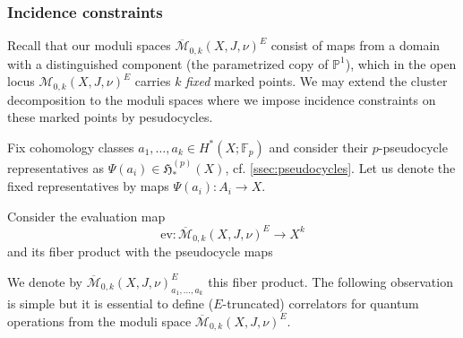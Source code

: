 \documentclass[reqno]{amsart}
\numberwithin{equation}{section}
\numberwithin{equation}{section}
\numberwithin{equation}{section}
\theoremstyle{definition}
\theoremstyle{remark}
\theoremstyle{remark}
\newcommand{\ov}{\overline}
\begin{document}
\subsubsection{Incidence constraints}

Recall that our moduli spaces $\ov{\mathcal{M}}_{0,k}(X,J, \nu)^E$ consist of maps from a domain with a distinguished component (the parametrized copy of $\mathbb{P}^1$), which in the open locus $\mathcal{M}_{0,k}(X,J, \nu)^E$ carries $k$ \emph{fixed} marked points. We may extend the cluster decomposition to the moduli spaces where we impose incidence constraints on these marked points by pesudocycles.

Fix cohomology classes $a_1, \dots, a_k \in H^*(X;\mathbb{F}_p)$ and consider their $p$-pseudocycle representatives as $\Psi(a_i) \in \mathfrak{H}_*^{(p)}(X)$, cf. \cref{ssec:pseudocycles}. Let us denote the fixed representatives by maps $\Psi(a_i): A_i \to X$.

Consider the evaluation map
\begin{equation}
    \mathrm{ev} : \ov{\mathcal{M}}_{0,k}(X,J, \nu)^E \to X^k
\end{equation}
and its fiber product with the pseudocycle maps
\begin{center}
\end{center}
We denote by $\ov{\mathcal{M}}_{0,k}(X,J, \nu)^E_{a_1, \dots, a_k}$ this fiber product. The following observation is simple but it is essential to define ($E$-truncated) correlators for quantum operations from the moduli space $\ov{\mathcal{M}}_{0,k}(X,J, \nu)^E$.
\end{document}
